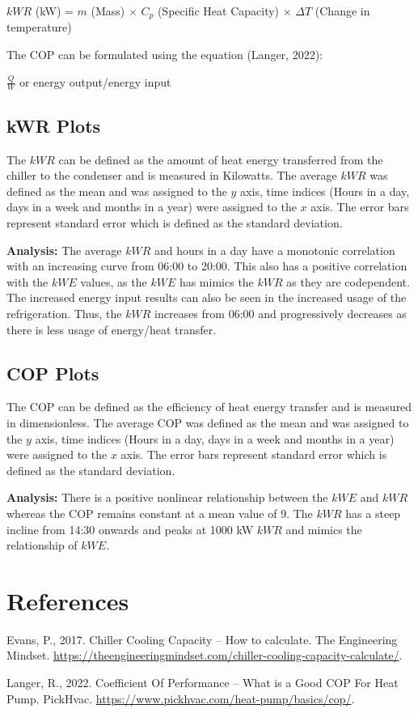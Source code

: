\documentclass{article}
\begin{document}
\begin{center}
$kWR$ (kW) = $m$ (Mass) $\times$ $C_p$ (Specific Heat Capacity) $\times$ $\Delta T$ (Change in temperature)
\end{center}

The COP can be formulated using the equation (Langer, 2022):

\begin{center}
$\frac{Q}{W}$ or energy output/energy input
\end{center}

\subsection{kWR Plots}
The $kWR$ can be defined as the amount of heat energy transferred from the chiller to the condenser and is measured in Kilowatts. The average $kWR$ was defined as the mean and was assigned to the $y$ axis, time indices (Hours in a day, days in a week and months in a year) were assigned to the $x$ axis. The error bars represent standard error which is defined as the standard deviation.

\textbf{Analysis:} The average $kWR$ and hours in a day have a monotonic correlation with an increasing curve from 06:00 to 20:00. This also has a positive correlation with the $kWE$ values, as the $kWE$ has mimics the $kWR$ as they are codependent. The increased energy input results can also be seen in the increased usage of the refrigeration. Thus, the $kWR$ increases from 06:00 and progressively decreases as there is less usage of energy/heat transfer.

\subsection{COP Plots}
The COP can be defined as the efficiency of heat energy transfer and is measured in dimensionless. The average COP was defined as the mean and was assigned to the $y$ axis, time indices (Hours in a day, days in a week and months in a year) were assigned to the $x$ axis. The error bars represent standard error which is defined as the standard deviation.

\textbf{Analysis:} There is a positive nonlinear relationship between the $kWE$ and $kWR$ whereas the COP remains constant at a mean value of 9. The $kWR$ has a steep incline from 14:30 onwards and peaks at 1000 kW $kWR$ and mimics the relationship of $kWE$.

\section{References}
Evans, P., 2017. Chiller Cooling Capacity – How to calculate. The Engineering Mindset. \url{https://theengineeringmindset.com/chiller-cooling-capacity-calculate/}.

Langer, R., 2022. Coefficient Of Performance – What is a Good COP For Heat Pump. PickHvac. \url{https://www.pickhvac.com/heat-pump/basics/cop/}.
\end{document}
